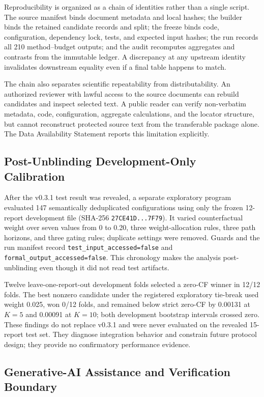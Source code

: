 \documentclass[applsci,article,submit,moreauthors]{Definitions/mdpi}
\begin{document}
Reproducibility is organized as a chain of identities rather than a single script. The source manifest binds document metadata and local hashes; the builder binds the retained candidate records and split; the freeze binds code, configuration, dependency lock, tests, and expected input hashes; the run records all 210 method--budget outputs; and the audit recomputes aggregates and contrasts from the immutable ledger. A discrepancy at any upstream identity invalidates downstream equality even if a final table happens to match.

The chain also separates scientific repeatability from distributability. An authorized reviewer with lawful access to the source documents can rebuild candidates and inspect selected text. A public reader can verify non-verbatim metadata, code, configuration, aggregate calculations, and the locator structure, but cannot reconstruct protected source text from the transferable package alone. The Data Availability Statement reports this limitation explicitly.

\subsection{Post-Unblinding Development-Only Calibration}

After the v0.3.1 test result was revealed, a separate exploratory program evaluated 147 semantically deduplicated configurations using only the frozen 12-report development file (SHA-256 \texttt{27CE41D...7F79}). It varied counterfactual weight over seven values from 0 to 0.20, three weight-allocation rules, three path horizons, and three gating rules; duplicate settings were removed. Guards and the run manifest record \texttt{test\_input\_accessed=false} and \texttt{formal\_output\_accessed=false}. This chronology makes the analysis post-unblinding even though it did not read test artifacts.

Twelve leave-one-report-out development folds selected a zero-CF winner in 12/12 folds. The best nonzero candidate under the registered exploratory tie-break used weight 0.025, won 0/12 folds, and remained below strict zero-CF by 0.00131 at $K=5$ and 0.00091 at $K=10$; both development bootstrap intervals crossed zero. These findings do not replace v0.3.1 and were never evaluated on the revealed 15-report test set. They diagnose integration behavior and constrain future protocol design; they provide no confirmatory performance evidence.

\subsection{Generative-AI Assistance and Verification Boundary}
\end{document}
